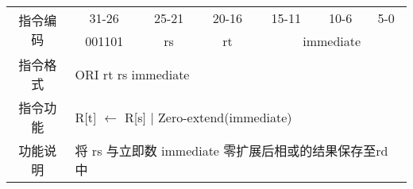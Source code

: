 	\begin{table}[!hbp]
		\centering
		\begin{tabular}{|c|c|c|c|c|c|c|}
		\hline
		\multirow{2}{*}{指令编码} & 31-26&25-21 & 20-16&15-11 &10-6 &5-0\\
		\cline{2-7} & 001101 & rs & rt & \multicolumn{3}{|c|}{immediate} \\
		\hline
		指令格式&\multicolumn{6}{|l|}{ORI rt rs immediate}\\
		\hline		
		指令功能&\multicolumn{6}{|l|}{R[t] $\leftarrow$  R[s] $|$ Zero-extend(immediate)}\\
		\hline		
		功能说明&\multicolumn{6}{|l|}{将 rs 与立即数 immediate 零扩展后相或的结果保存至rd 中}\\
		\hline
		\end{tabular}
	\end{table}
\newpage

